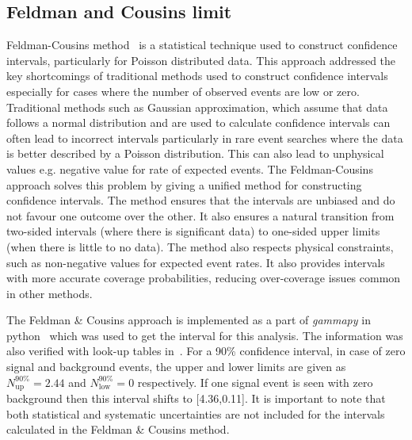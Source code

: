 \subsection{Feldman and Cousins limit}
\label{subsec:FandC}
Feldman-Cousins method~\cite{Feldman:1997qc} is a statistical technique used to construct confidence intervals, particularly for Poisson distributed data. This approach addressed the key shortcomings of traditional methods used to construct confidence intervals especially for cases where the number of observed events are low or zero. Traditional methods such as Gaussian approximation, which assume that data follows a normal distribution and are used to calculate confidence intervals can often lead to incorrect intervals particularly in rare event searches where the data is better described by a Poisson distribution. This can also lead to unphysical values e.g. negative value for rate of expected events. The Feldman-Cousins approach solves this problem by giving a unified method for constructing confidence intervals. The method ensures that the intervals are unbiased and do not favour one outcome over the other. It also ensures a natural transition from two-sided intervals (where there is significant data) to one-sided upper limits (when there is little to no data). The method also respects physical constraints, such as non-negative values for expected event rates. It also provides intervals with more accurate coverage probabilities, reducing over-coverage issues common in other methods. 

The Feldman \& Cousins approach is implemented as a part of \textit{gammapy} in python~\cite{Gammapy:2023gvb} which was used to get the interval for this analysis. The information was also verified with look-up tables in~\cite{Feldman:1997qc}. For a 90\% confidence interval, in case of zero signal and background events, the upper and lower limits are given as $N^{90\%}_{\text{up}} = 2.44$ and $N^{90\%}_{\text{low}} = 0$ respectively. If one signal event is seen with zero background then this interval shifts to [4.36,0.11]. It is important to note that both statistical and systematic uncertainties are not included for the intervals calculated in the Feldman \& Cousins method. 

